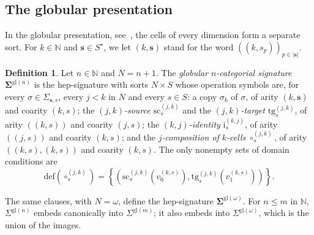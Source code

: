 \documentclass[a4paper,reqno]{amsart}
\newcommand{\bb}[1]{\lvert #1 \rvert}           %
\newcommand{\sig}[1]{\mathbf{#1}}                %
\newcommand{\gl}{\mathrm{gl}}
\newcommand{\src}{\mathrm{sc}}
\newcommand{\tgt}{\mathrm{tg}}
\newcommand{\ii}{\mathrm{i}}
\newcommand{\defi}{\mathrm{def}}
\theoremstyle{plain}
\theoremstyle{definition}
\newtheorem{definition}[theorem]{Definition}
\begin{document}
\subsection{The globular presentation}

In the globular presentation, see~\cite{abgmmm23}, the cells of every dimension form a separate sort.
For $k\in\mathbb{N}$ and $\mathbf{s}\in S^{\star}$, we let $(k,\mathbf{s})$ stand for the word $((k,s_{p}))_{p\in\bb{\mathbf{s}}}$.

\begin{definition}\label{DSigmaCatGlobular}
Let $n\in\mathbb{N}$ and $N=n+1$.
The \emph{globular $n$-categorial signature} $\sig{\Sigma}^{\gl(n)}$ is the hep-signature with sorts $N\times S$ whose operation symbols are, for every $\sigma\in\Sigma_{\mathbf{s},s}$, every $j<k$ in $N$ and every $s\in S$: a copy $\sigma_{k}$ of $\sigma$, of arity $(k,\mathbf{s})$ and coarity $(k,s)$; the \emph{$(j,k)$-source} $\src^{(j,k)}_{s}$ and the \emph{$(j,k)$-target} $\tgt^{(j,k)}_{s}$, of arity $((k,s))$ and coarity $(j,s)$; the \emph{$(k,j)$-identity} $\ii^{(k,j)}_{s}$, of arity $((j,s))$ and coarity $(k,s)$; and the \emph{$j$-composition of $k$-cells} $\circ^{(j,k)}_{s}$, of arity $((k,s),(k,s))$ and coarity $(k,s)$.
The only nonempty sets of domain conditions are
$$
\defi(\circ^{(j,k)}_{s})=\left\{\left(\src^{(j,k)}_{s}(v^{(k,s)}_{0}),\tgt^{(j,k)}_{s}(v^{(k,s)}_{1})\right)\right\}.
$$
\end{definition}

The same clauses, with $N=\omega$, define the hep-signature $\sig{\Sigma}^{\gl(\omega)}$.
For $n\leq m$ in $\mathbb{N}$, $\Sigma^{\gl(n)}$ embeds canonically into $\Sigma^{\gl(m)}$; it also embeds into $\Sigma^{\gl(\omega)}$, which is the union of the images.
\end{document}
